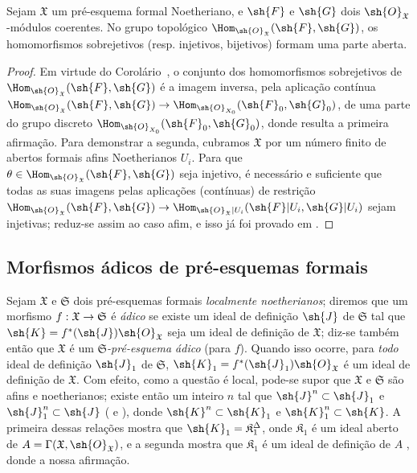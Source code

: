 \documentclass[oneside]{amsart}
\makeatletter
\newcommand{\ega@arrow}[2]{\mathchoice{#1}{#2}{#2}{#2}}
\renewcommand{\to}{\ega@arrow{\longrightarrow}{\rightarrow}}
\newcommand{\oldpage}[2][]{{\marginnote{\normalfont\textbf{#1}~|~#2}}\ignorespaces}
\let\EGAOriginalLabel\label
\renewcommand{\label}[1]{\phantomsection\EGAOriginalLabel{#1}}
\makeatother
\begin{document}
\begin{proposition}[10.11.9]
\label{I.10.11.9}
Sejam $\mathfrak{X}$ um pré-esquema formal Noetheriano, e $\sh{F}$ e $\sh{G}$ dois $\sh{O}_\mathfrak{X}$-módulos coerentes.
No grupo topológico $\Hom_{\sh{O}_\mathfrak{X}}(\sh{F},\sh{G})$, os homomorfismos sobrejetivos (resp. injetivos, bijetivos) formam uma parte aberta.
\end{proposition}

\begin{proof}
Em virtude do Corolário~, o conjunto dos homomorfismos sobrejetivos de $\Hom_{\sh{O}_\mathfrak{X}}(\sh{F},\sh{G})$ é a imagem inversa, pela aplicação contínua $\Hom_{\sh{O}_\mathfrak{X}}(\sh{F},\sh{G})\to\Hom_{\sh{O}_{X_0}}(\sh{F}_0,\sh{G}_0)$, de uma parte do grupo discreto $\Hom_{\sh{O}_{X_0}}(\sh{F}_0,\sh{G}_0)$, donde resulta a primeira afirmação.
Para demonstrar a segunda, cubramos $\mathfrak{X}$ por um número finito de abertos formais afins Noetherianos $U_i$.
Para que $\theta\in\Hom_{\sh{O}_\mathfrak{X}}(\sh{F},\sh{G})$ seja injetivo, é necessário e suficiente que todas as suas imagens pelas aplicações (contínuas) de restrição $\Hom_{\sh{O}_\mathfrak{X}}(\sh{F},\sh{G})\to\Hom_{\sh{O}_\mathfrak{X}|U_i}(\sh{F}|U_i,\sh{G}|U_i)$ sejam injetivas; reduz-se assim ao caso afim, e isso já foi provado em .
\end{proof}

\subsection{Morfismos ádicos de pré-esquemas formais}
\label{subsection:I.10.12}

\begin{env}[10.12.1]
\label{I.10.12.1}
\oldpage[I]{206}
Sejam $\mathfrak{X}$ e $\mathfrak{S}$ dois pré-esquemas formais \emph{localmente noetherianos};
diremos que um morfismo $f:\mathfrak{X}\to\mathfrak{S}$ é \emph{ádico} se existe um ideal de definição $\sh{J}$ de $\mathfrak{S}$ tal que $\sh{K}=f^*(\sh{J})\sh{O}_\mathfrak{X}$ seja um ideal de definição de $\mathfrak{X}$;
diz-se também então que $\mathfrak{X}$ é um \emph{$\mathfrak{S}$-pré-esquema ádico} (para $f$).
Quando isso ocorre, para \emph{todo} ideal de definição $\sh{J}_1$ de $\mathfrak{S}$, $\sh{K}_1=f^*(\sh{J}_1)\sh{O}_\mathfrak{X}$ é um ideal de definição de $\mathfrak{X}$.
Com efeito, como a questão é local, pode-se supor que $\mathfrak{X}$ e $\mathfrak{S}$ são afins e noetherianos;
existe então um inteiro $n$ tal que $\sh{J}^n\subset\sh{J}_1$ e $\sh{J}_1^n\subset\sh{J}$ ( e ), donde $\sh{K}^n\subset\sh{K}_1$ e $\sh{K}_1^n\subset\sh{K}$.
A primeira dessas relações mostra que $\sh{K}_1=\mathfrak{K}_1^\Delta$, onde $\mathfrak{K}_1$ é um ideal aberto de $A=\Gamma(\mathfrak{X},\sh{O}_\mathfrak{X})$, e a segunda mostra que $\mathfrak{K}_1$ é um ideal de definição de $A$ , donde a nossa afirmação.
\end{env}
\end{document}
